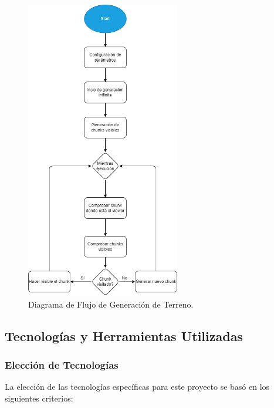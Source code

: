 \begin{figure}[H]
    \centering
    \includegraphics[width=0.6\textwidth]{img/FlowDiagramgeneracionInfinita.png}
    \caption{Diagrama de Flujo de Generación de Terreno.}
\end{figure}


\subsection{Tecnologías y Herramientas Utilizadas}

\subsubsection{Elección de Tecnologías}
La elección de las tecnologías específicas para este proyecto se basó en los siguientes criterios:

